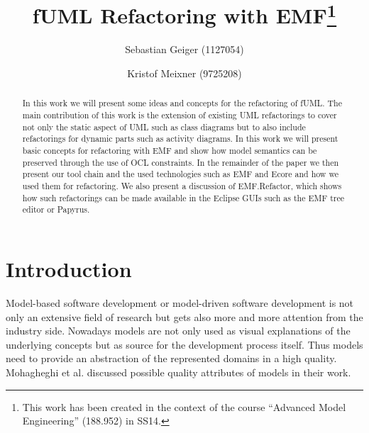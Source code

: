 \documentclass{llncs}
\begin{document}
\pagestyle{plain}

\title{fUML Refactoring with EMF\footnote{This work has been created in the context of the course ``Advanced Model Engineering'' (188.952) in SS14.}}

\author{Sebastian Geiger (1127054) \and Kristof Meixner (9725208)}

\maketitle

\begin{abstract}
In this work we will present some ideas and concepts for the refactoring of fUML. The main contribution of this work is the extension of
existing UML refactorings to cover not only the static aspect of UML such as class diagrams but to also include refactorings for dynamic
parts such as activity diagrams. In this work we will present basic concepts for refactoring with EMF and show how model semantics can be
preserved through the use of OCL constraints. In the remainder of the paper we then present our tool chain and the used technologies
such as EMF and Ecore and how we used them for refactoring. We also present a discussion of EMF.Refactor, which shows how such refactorings
can be made available in the Eclipse GUIs such as the EMF tree editor or Papyrus.
\end{abstract}

\tableofcontents
\newpage


\section{Introduction}

Model-based software development or model-driven software development is not only an extensive field of research but
gets also more and more attention from the industry side. Nowadays models are not only used as visual explanations of
the underlying concepts but as source for the development process itself. Thus models need to provide an abstraction of
the represented domains in a high quality. Mohagheghi et al. \cite{DBLP:journals/infsof/MohagheghiDN09} discussed possible 
quality attributes of models in their work.
\end{document}
